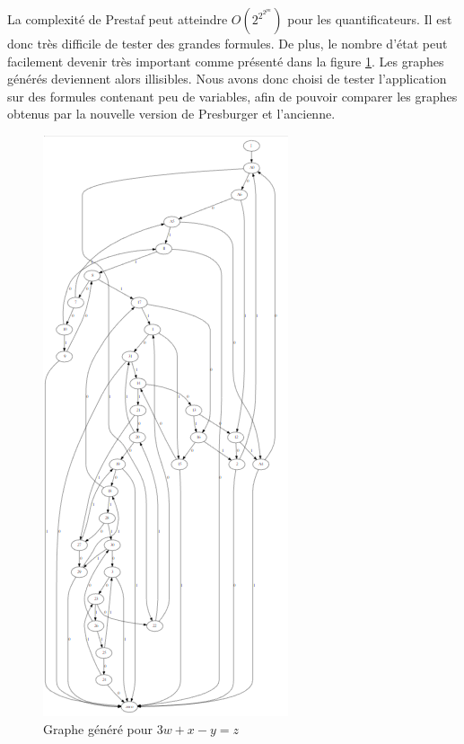 La complexité de Prestaf peut atteindre $O(2^{2^{2^{pn}}})$ pour les quantificateurs. Il est donc très difficile de tester des grandes formules. De plus, le nombre d'état peut facilement devenir très important comme présenté dans la figure \ref{image1}. Les graphes générés deviennent alors illisibles.
Nous avons donc choisi de tester l'application sur des formules contenant peu de variables, afin de pouvoir comparer les graphes obtenus par la nouvelle version de Presburger et l'ancienne.
\begin{figure}

\includegraphics[scale=0.5]{graphe.png}

\caption{Graphe généré pour $3w+x-y=z$}
\label{image1}
\end{figure}
